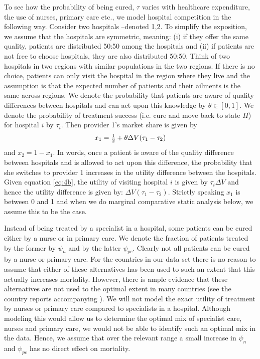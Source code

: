 \documentclass{article}
\begin{document}
To see how the probability of being cured, \(\tau\) varies with healthcare expenditure, the use of nurses, primary care etc., we model hospital competition in the following way. Consider two hospitals --denoted 1,2. To simplify the exposition, we assume that the hospitals are symmetric, meaning: (i) if they offer the same quality, patients are distributed 50:50 among the hospitals and (ii) if patients are not free to choose hospitals, they are also distributed 50:50. Think of two hospitals in two regions with similar populations in the two regions. If there is no choice, patients can only visit the hospital in the region where they live and the assumption is that the expected number of patients and their ailments is the same across regions. We denote the probability that patients are aware of quality differences between hospitals and can act upon this knowledge by \(\theta \in [0,1]\). We denote the probability of treatment success (i.e. cure and move back to state \(H\)) for hospital \(i\)  by \(\tau_i\). Then provider 1's market share is given by
\begin{equation}
\label{eq:8}
x_1 = \textstyle{1\over 2}  + \theta \Delta V (\tau_1 - \tau_2)
\end{equation}
and \(x_2 = 1- x_1\). In words, once a patient is aware of the quality difference between hospitals and is allowed to act upon this difference, the probability that she switches to provider 1 increases in the utility difference between the hospitals. Given equation \eqref{eq:4b}, the utility of visiting hospital \(i\) is given by \(\tau_i \Delta V\) and hence the utility difference is given by: \(\Delta V (\tau_1-\tau_2)\). Strictly speaking \(x_1\) is between 0 and 1 and when we do marginal comparative static analysis below, we assume this to be the case.

Instead of being treated by a specialist in a hospital, some patients can be cured either by a nurse or in primary care. We denote the fraction of patients treated by the former by \(\psi_n\) and by the latter \(\psi_{pc}\). Clearly not all patients can be cured by a nurse or primary care. For the countries in our data set there is no reason to assume that either of these alternatives has been used to such an extent that this actually increases mortality. However, there is ample evidence that these alternatives are not used to the optimal extent in many countries (see the country reports accompanying \cite{countryprofileReport}). We will not model the exact utility of treatment by nurses or primary care compared to specialists in a hospital. Although modeling this would allow us to determine the optimal mix of specialist care, nurses and primary care, we would not be able to identify such an optimal mix in the data. Hence, we assume that over the relevant range a small increase in \(\psi_n\) and \(\psi_{pc}\) has no direct effect on mortality.
\end{document}
